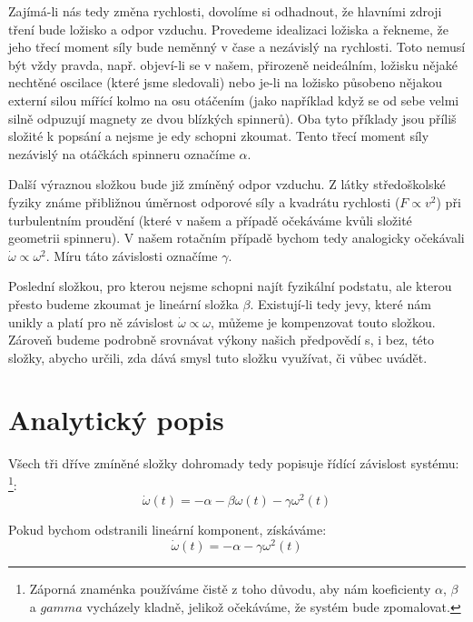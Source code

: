 \documentclass[12pt, a4paper,
 twoside,        %
 openright
]{report}
\begin{document}
Zajímá-li nás tedy změna rychlosti, dovolíme si odhadnout, že hlavními zdroji tření bude ložisko a odpor vzduchu. Provedeme idealizaci ložiska a řekneme, že jeho třecí moment síly bude neměnný v čase a nezávislý na rychlosti. Toto nemusí být vždy pravda, např. objeví-li se v našem, přirozeně neideálním, ložisku nějaké nechtěné oscilace (které jsme sledovali) nebo je-li na ložisko působeno nějakou externí silou mířící kolmo na osu otáčením (jako například když se od sebe velmi silně odpuzují magnety ze dvou blízkých spinnerů). Oba tyto příklady jsou příliš složité k popsání a nejsme je edy schopni zkoumat. Tento třecí moment síly nezávislý na otáčkách spinneru označíme $\alpha$.

Další výraznou složkou bude již zmíněný odpor vzduchu. Z látky středoškolské fyziky známe přibližnou úměrnost odporové síly a kvadrátu rychlosti ($F \propto v^2$) při turbulentním proudění (které v našem a případě očekáváme kvůli složité geometrii spinneru). V našem rotačním případě bychom tedy analogicky očekávali $\dot{\omega} \propto \omega^2$. Míru táto závislosti označíme $\gamma$.

Poslední složkou, pro kterou nejsme schopni najít fyzikální podstatu, ale kterou přesto budeme zkoumat je lineární složka $\beta$. Existují-li tedy jevy, které nám unikly a platí pro ně závislost $\dot{\omega} \propto \omega$, můžeme je kompenzovat touto složkou. Zároveň budeme podrobně srovnávat výkony našich předpovědí s, i bez, této složky, abycho určili, zda dává smysl tuto složku využívat, či vůbec uvádět.

\clearpage

\section{Analytický popis}

Všech tři dříve zmíněné složky dohromady tedy popisuje řídící závislost systému: \footnote{Záporná znaménka používáme čistě z toho důvodu, aby nám koeficienty $\alpha$, $\beta$ a $gamma$ vycházely kladně, jelikož očekáváme, že systém bude zpomalovat.}:
\begin{equation}
    \label{eq:drag_diff_wlin}
    \dot{\omega}(t) = - \alpha - \beta \omega(t) - \gamma \omega^2(t) 
\end{equation}

Pokud bychom odstranili lineární komponent, získáváme:
\begin{equation}
    \label{eq:drag_diff}
    \dot{\omega}(t) = - \alpha - \gamma \omega^2(t) 
\end{equation}
\end{document}

